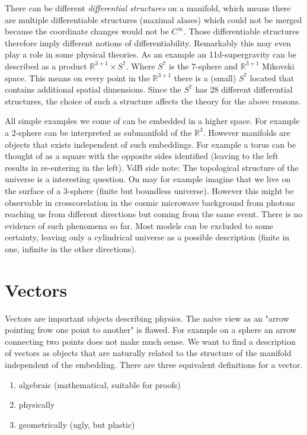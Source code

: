 \begin{sidenote}
There can be different \emph{differential structures} on a manifold, 
which means there are multiple differentiable structures (maximal alases) which could not be merged because the coordinate changes 
would not be $C^\infty$. Those differentiable structures therefore imply different notions of differentiability. 
Remarkably this may even play a role in some physical theories. 
As an example an 11d-supergravity can be described as a product $\mathbb{R}^{3+1}\times S^7$. 
Where $S^7$ is the 7-sphere and $\mathbb{R}^{3+1}$ Mikovski space.
This means on every point in the $\mathbb{R}^{3+1}$ there is a (small) $S^7$  located that contains additional spatial dimensions. 
Since the $S^7$ has 28 different differential structures, the choice of such a structure affects the theory for the above reasons.
\end{sidenote}
All simple examples we come of can be embedded in a higher space. 
For example a 2-sphere can be interpreted as submanifold of the $\mathbb{R}^3$. 
However manifolds are objects that exists independent of such embeddings. 
For example a torus can be thought of as a square with the opposite sides identified (leaving to the left results in re-entering in the left).
VdB side note: The topological structure of the universe is a interesting question.  
On may for example imagine that we live on the surface of a 3-sphere (finite but boundless universe). 
However this might be observable in crosscorelation in the cosmic microwave background from photons reaching us 
from different directions but coming from the same event. There is no evidence of such phenomena so far. 
Most models can be excluded to some certainty, leaving only a cylindrical universe as a possible description 
(finite in one, infinite in the other directions).
\section{Vectors}
Vectors are important objects describing physics. The naive view as an "arrow pointing frow one point to another" is flawed. 
For example on a sphere an arrow connecting two points does not make much sense.
We want to find a description of vectors as objects that are naturally related to the structure of the manifold independent of the embedding.
There are three equivalent definitions for a vector.
\begin{enumerate}
    \item algebraic (mathematical, suitable for proofs)
    \item physically
    \item geometrically (ugly, but plastic)
\end{enumerate}
